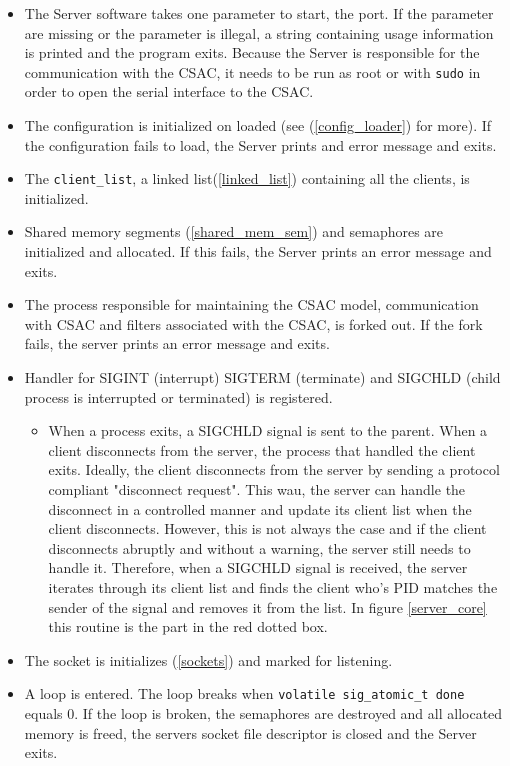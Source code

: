 \documentclass[12pt,english,a4paper]{report}
\begin{document}
\begin{itemize} %
  \item The Server software takes one parameter to start, the port. If the parameter are missing or the parameter is illegal, a string containing usage information is printed and the program exits. Because the Server is responsible for the communication with the CSAC, it needs to be run as root or with \texttt{sudo} in order to open the serial interface to the CSAC.
  \item The configuration is initialized on loaded (see (\ref{config_loader}) for more). If the configuration fails to load, the Server prints and error message and exits.
  \item The \texttt{client\_list}, a linked list(\ref{linked_list}) containing all the clients, is initialized.
  \item Shared memory segments (\ref{shared_mem_sem}) and semaphores are initialized and allocated. If this fails, the Server prints an error message and exits.
  \item The process responsible for maintaining the CSAC model, communication with CSAC and filters associated with the CSAC, is forked out. If the fork fails, the server prints an error message and exits.
  \item Handler for SIGINT (interrupt) SIGTERM (terminate) and SIGCHLD (child process is interrupted or terminated) is registered.
  \begin{itemize}
      \item When a process exits, a SIGCHLD signal is sent to the parent. When a client disconnects from the server, the process that handled the client exits. Ideally, the client disconnects from the server by sending a protocol compliant "disconnect request". This wau, the server can handle the disconnect in a controlled manner and update its client list when the client disconnects. However, this is not always the case and if the client disconnects abruptly and without a warning, the server still needs to handle it. Therefore, when a SIGCHLD signal is received, the server iterates through its client list and finds the client who's PID matches the sender of the signal and removes it from the list. In figure \ref{server_core} this routine is the part in the red dotted box. 
  \end{itemize}
  \item The socket is initializes (\ref{sockets}) and marked for listening.
  \item A loop is entered. The loop breaks when \texttt{volatile sig\_atomic\_t done} equals 0. If the loop is broken, the semaphores are destroyed and all allocated memory is freed, the servers socket file descriptor is closed and the Server exits.

\end{itemize}
\end{document}
